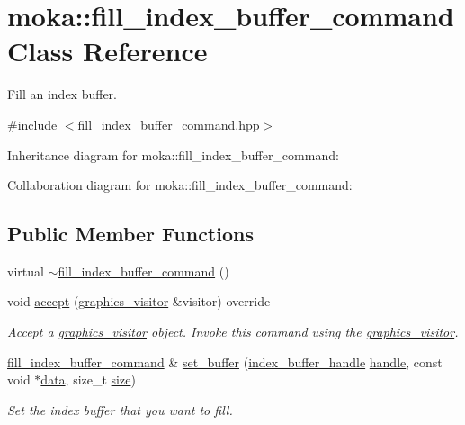 \hypertarget{classmoka_1_1fill__index__buffer__command}{}\section{moka\+::fill\+\_\+index\+\_\+buffer\+\_\+command Class Reference}
\label{classmoka_1_1fill__index__buffer__command}


Fill an index buffer.  




{\ttfamily \#include $<$fill\+\_\+index\+\_\+buffer\+\_\+command.\+hpp$>$}



Inheritance diagram for moka\+::fill\+\_\+index\+\_\+buffer\+\_\+command\+:


Collaboration diagram for moka\+::fill\+\_\+index\+\_\+buffer\+\_\+command\+:
\subsection*{Public Member Functions}
\begin{DoxyCompactItemize}
\item 
virtual \mbox{\hyperlink{classmoka_1_1fill__index__buffer__command_a1d80fc9790fa6bfd3962c88f69034ee6}{$\sim$fill\+\_\+index\+\_\+buffer\+\_\+command}} ()
\item 
void \mbox{\hyperlink{classmoka_1_1fill__index__buffer__command_aff2bfc0447ac04a037fb0626a93a81c6}{accept}} (\mbox{\hyperlink{classmoka_1_1graphics__visitor}{graphics\+\_\+visitor}} \&visitor) override
\begin{DoxyCompactList}\small\item\em Accept a \mbox{\hyperlink{classmoka_1_1graphics__visitor}{graphics\+\_\+visitor}} object. Invoke this command using the \mbox{\hyperlink{classmoka_1_1graphics__visitor}{graphics\+\_\+visitor}}. \end{DoxyCompactList}\item 
\mbox{\hyperlink{classmoka_1_1fill__index__buffer__command}{fill\+\_\+index\+\_\+buffer\+\_\+command}} \& \mbox{\hyperlink{classmoka_1_1fill__index__buffer__command_a44916b1b5e00f4df93bbb453098a1251}{set\+\_\+buffer}} (\mbox{\hyperlink{structmoka_1_1index__buffer__handle}{index\+\_\+buffer\+\_\+handle}} \mbox{\hyperlink{classmoka_1_1fill__index__buffer__command_a436152e12a1013d8e33208793b875f8a}{handle}}, const void $\ast$\mbox{\hyperlink{classmoka_1_1fill__index__buffer__command_ab82dcdae72665ef253acfdc34bd69e56}{data}}, size\+\_\+t \mbox{\hyperlink{classmoka_1_1fill__index__buffer__command_a08c9fa00714604bcd18e6b49b6b93974}{size}})
\begin{DoxyCompactList}\small\item\em Set the index buffer that you want to fill. \end{DoxyCompactList}\end{DoxyCompactItemize}
